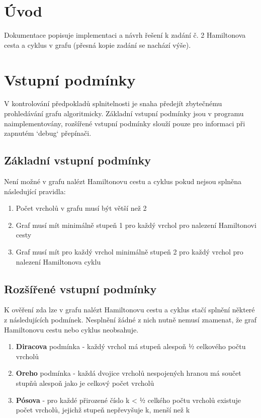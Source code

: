\documentclass[a4paper,11pt]{article}
\begin{document}
\section{Úvod}

Dokumentace popisuje implementaci a návrh řešení k zadání č. 2 Hamiltonova cesta a cyklus v grafu (přesná kopie zadání se nachází výše).

\section{Vstupní podmínky}

V kontrolování předpokladů splnitelnosti je snaha předejít zbytečnému prohledávání grafu algoritmicky. Základní vstupní podmínky jsou v programu naimplementovány, rozšířené vstupní podmínky slouží pouze pro informaci při zapnutém `debug` přepínači. 

\subsection{Základní vstupní podmínky}

Není možné v grafu nalézt Hamiltonovu cestu a cyklus pokud nejsou splněna následující pravidla:
\begin{enumerate}
	\item Počet vrcholů v grafu musí být větší než 2
	\item Graf musí mít minimálně stupeň 1 pro každý vrchol pro nalezení Hamiltonovi cesty
    \item Graf musí mít pro každý vrchol minimálně stupeň 2 pro každý vrchol pro nalezení Hamiltonova cyklu
\end{enumerate}
\newpage
\subsection{Rozšířené vstupní podmínky}

K ověření zda lze v grafu nalézt Hamiltonovu cestu a cyklus stačí splnění některé z následujících podmínek. Nesplnění žádné z nich nutně nemusí znamenat, že graf Hamiltonovu cestu nebo cyklus neobsahuje.
\begin{enumerate}
    \item \textbf{Diracova} podmínka - každý vrchol má stupeň alespoň ½ celkového počtu vrcholů
    \item \textbf{Oreho} podmínka - každá dvojice vrcholů nespojených hranou má součet stupňů alespoň jako je celkový počet vrcholů
    \item \textbf{Pósova} - pro každé přirozené číslo k < ½ celkého počtu vrcholů existuje počet vrcholů, jejichž stupeň nepřevyšuje k, menší než k
\end{enumerate}
\end{document}

